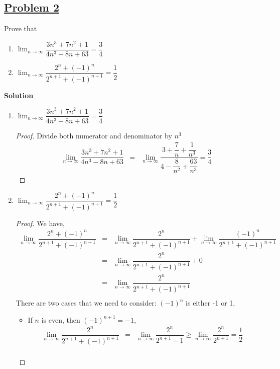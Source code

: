 \documentclass[10pt,letterpaper]{article}
\newcommand{\sol}{\textbf{Solution}}
\begin{document}
	\subsection*{{\color{red}\underline{Problem 2}}}
	Prove that
	\begin{enumerate}[label=(\roman{*})]
		\item $\displaystyle\lim_{n\to \infty}\dfrac{3n^3 + 7n^2 + 1}{4n^3 - 8n + 63} = \dfrac{3}{4}$
		\item $\displaystyle\lim_{n\to \infty} \dfrac{2^n + (-1)^n}{2^{n+1} + (-1)^{n+1}} = \dfrac{1}{2}$
	\end{enumerate}
	\sol
	\begin{enumerate}[label=(\roman{*})]
		\item $\displaystyle\lim_{n\to \infty}\dfrac{3n^3 + 7n^2 + 1}{4n^3 - 8n + 63} = \dfrac{3}{4}$
		\begin{proof}
			Divide both numerator and denominator by $n^3$
			\begin{eqnarray*}
				\displaystyle\lim_{n\to \infty}\dfrac{3n^3 + 7n^2 + 1}{4n^3 - 8n + 63} &=&
				\displaystyle\lim_{n\to \infty}\dfrac{3 + \dfrac{7}{n} + \dfrac{1}{n^3}}
				{4 - \dfrac{8}{n^2} + \dfrac{63}{n^3}}= \dfrac{3}{4}
			\end{eqnarray*}
		\end{proof}
		\item $\displaystyle\lim_{n\to \infty} \dfrac{2^n + (-1)^n}{2^{n+1} + (-1)^{n+1}} = \dfrac{1}{2}$
		\begin{proof}
			We have,
			\begin{eqnarray*}
				\displaystyle\lim_{n\to \infty} \dfrac{2^n + (-1)^n}{2^{n+1} + (-1)^{n+1}} &=&
				\displaystyle\lim_{n\to \infty} \dfrac{2^n}{2^{n+1} + (-1)^{n+1}} + 
				\displaystyle\lim_{n\to \infty} \dfrac{(-1)^n}{2^{n+1} + (-1)^{n+1}} \\
				&=&\displaystyle\lim_{n\to \infty} \dfrac{2^n}{2^{n+1} + (-1)^{n+1}} + 0 \\
				&=&\displaystyle\lim_{n\to \infty} \dfrac{2^n}{2^{n+1} + (-1)^{n+1}} \\
			\end{eqnarray*}
			There are two cases that we need to consider: $(-1)^n$ is either -1 or 1,
			\begin{itemize}
			\item If $n$ is even, then $(-1)^{n+1} = -1$, 
			\begin{eqnarray*}
				\displaystyle\lim_{n\to \infty} \dfrac{2^n}{2^{n+1} + (-1)^{n+1}}  &=&
				\displaystyle\lim_{n\to \infty} \dfrac{2^n}{2^{n+1} - 1} 
				\geq  \displaystyle\lim_{n\to \infty} \dfrac{2^n}{2^{n+1}} = \dfrac{1}{2}\\
			\end{eqnarray*}
			

\end{itemize}
\end{proof}
\end{enumerate}
\end{document}
